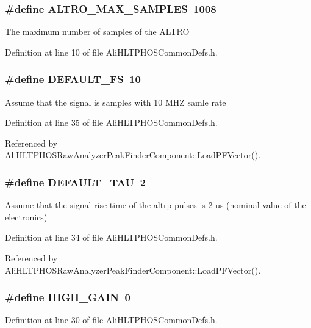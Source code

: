 \subsubsection{\setlength{\rightskip}{0pt plus 5cm}\#define ALTRO\_\-MAX\_\-SAMPLES\ 1008}\label{AliHLTPHOSCommonDefs_8h_a5}


The maximum number of samples of the ALTRO 

Definition at line 10 of file Ali\-HLTPHOSCommon\-Defs.h.
\subsubsection{\setlength{\rightskip}{0pt plus 5cm}\#define DEFAULT\_\-FS\ 10}\label{AliHLTPHOSCommonDefs_8h_a20}


Assume that the signal is samples with 10 MHZ samle rate 

Definition at line 35 of file Ali\-HLTPHOSCommon\-Defs.h.

Referenced by Ali\-HLTPHOSRaw\-Analyzer\-Peak\-Finder\-Component::Load\-PFVector().
\subsubsection{\setlength{\rightskip}{0pt plus 5cm}\#define DEFAULT\_\-TAU\ 2}\label{AliHLTPHOSCommonDefs_8h_a19}


Assume that the signal rise time of the altrp pulses is 2 us (nominal value of the electronics) 

Definition at line 34 of file Ali\-HLTPHOSCommon\-Defs.h.

Referenced by Ali\-HLTPHOSRaw\-Analyzer\-Peak\-Finder\-Component::Load\-PFVector().
\subsubsection{\setlength{\rightskip}{0pt plus 5cm}\#define HIGH\_\-GAIN\ 0}\label{AliHLTPHOSCommonDefs_8h_a18}




Definition at line 30 of file Ali\-HLTPHOSCommon\-Defs.h.
